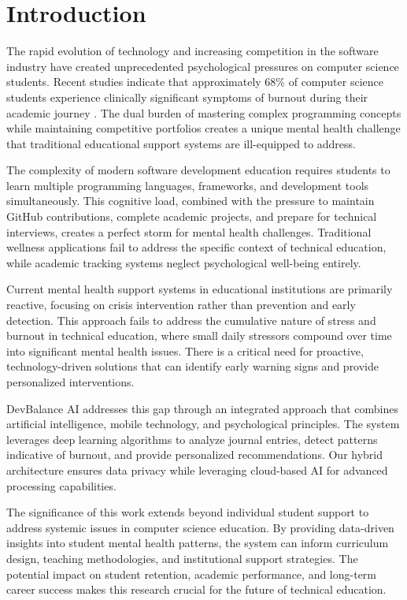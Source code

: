 \documentclass[conference,10pt]{IEEEtran}
\begin{document}
\section{Introduction}

The rapid evolution of technology and increasing competition in the software industry have created unprecedented psychological pressures on computer science students. Recent studies indicate that approximately 68\% of computer science students experience clinically significant symptoms of burnout during their academic journey \cite{smith2021}. The dual burden of mastering complex programming concepts while maintaining competitive portfolios creates a unique mental health challenge that traditional educational support systems are ill-equipped to address.

The complexity of modern software development education requires students to learn multiple programming languages, frameworks, and development tools simultaneously. This cognitive load, combined with the pressure to maintain GitHub contributions, complete academic projects, and prepare for technical interviews, creates a perfect storm for mental health challenges. Traditional wellness applications fail to address the specific context of technical education, while academic tracking systems neglect psychological well-being entirely.

Current mental health support systems in educational institutions are primarily reactive, focusing on crisis intervention rather than prevention and early detection. This approach fails to address the cumulative nature of stress and burnout in technical education, where small daily stressors compound over time into significant mental health issues. There is a critical need for proactive, technology-driven solutions that can identify early warning signs and provide personalized interventions.

DevBalance AI addresses this gap through an integrated approach that combines artificial intelligence, mobile technology, and psychological principles. The system leverages deep learning algorithms to analyze journal entries, detect patterns indicative of burnout, and provide personalized recommendations. Our hybrid architecture ensures data privacy while leveraging cloud-based AI for advanced processing capabilities.

The significance of this work extends beyond individual student support to address systemic issues in computer science education. By providing data-driven insights into student mental health patterns, the system can inform curriculum design, teaching methodologies, and institutional support strategies. The potential impact on student retention, academic performance, and long-term career success makes this research crucial for the future of technical education.
\end{document}
